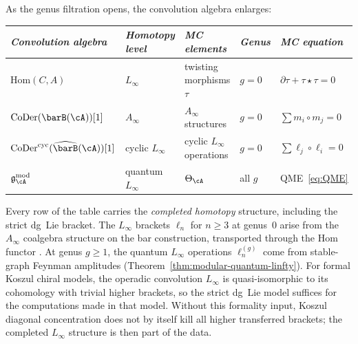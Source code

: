 \begin{remark}
\label{rem:convolution-hierarchy}
As the genus filtration opens, the convolution algebra enlarges:

\smallskip
\begin{center}
\renewcommand{\arraystretch}{1.4}
\begin{tabular}{lllll}
\toprule
\emph{Convolution algebra} & \emph{Homotopy level}
 & \emph{MC elements}
 & \emph{Genus} & \emph{MC equation} \\
\midrule
$\mathrm{Hom}(C, A)$
 & $L_\infty$ \cite[Thm.~10.3.8]{LV12}
 & twisting morphisms $\tau$
 & $g = 0$
 & $\partial\tau + \tau\star\tau = 0$ \\
$\mathrm{CoDer}(\barB(\cA))[1]$
 & $A_\infty$
 & $A_\infty$ structures
 & $g = 0$
 & $\sum m_i \circ m_j = 0$ \\
$\operatorname{CoDer}^{\mathrm{cyc}}(\widehat{\barB}(\cA))[1]$
 & cyclic $L_\infty$
 & cyclic $L_\infty$ operations
 & $g = 0$
 & $\sum \ell_j \circ \ell_i = 0$ \\
$\mathfrak{g}_\cA^{\mathrm{mod}}$
 & quantum $L_\infty$
 & $\Theta_\cA$
 & all $g$
 & QME~\eqref{eq:QME} \\
\bottomrule
\end{tabular}
\end{center}
\smallskip

\noindent
Every row of the table carries the \emph{completed homotopy} structure,
including the strict dg~Lie bracket. The $L_\infty$ brackets
$\ell_n$ for $n \geq 3$ at genus~$0$ arise from the $A_\infty$
coalgebra structure on the bar construction, transported through
the Hom functor
\cite[Theorem~10.3.8]{LV12}.
At genus $g \geq 1$, the quantum $L_\infty$ operations $\ell_n^{(g)}$
come from stable-graph Feynman amplitudes
(Theorem~\ref{thm:modular-quantum-linfty}).
For formal Koszul chiral models, the operadic convolution
$L_\infty$ is quasi-isomorphic to its cohomology with trivial
higher brackets, so the strict dg~Lie model suffices for the
computations made in that model. Without this formality input,
Koszul diagonal concentration does not by itself kill all higher
transferred brackets; the completed $L_\infty$ structure is then part
of the data.


\end{remark}
